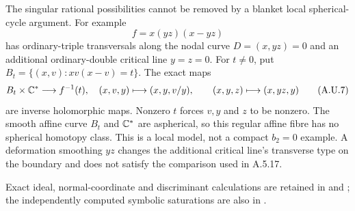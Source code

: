 The singular rational possibilities cannot be
removed by a blanket local spherical-cycle argument.
For example
\[
                     f=x(yz)(x-yz)
                                                        \tag{A.U.6}
\]
has ordinary-triple transversals along the nodal curve
$D=(x,yz)=0$ and an additional ordinary-double
critical line $y=z=0$. For $t\ne0$, put
$B_t=\{(x,v):xv(x-v)=t\}$. The exact maps
\[
 B_t\times\mathbb C^*\longrightarrow f^{-1}(t),
 \quad (x,v,y)\longmapsto(x,y,v/y),\qquad
 (x,y,z)\longmapsto(x,yz,y)
                                                        \tag{A.U.7}
\]
are inverse holomorphic maps. Nonzero $t$ forces
$v,y$ and $z$ to be nonzero. The smooth affine
curve $B_t$ and $\mathbb C^*$ are aspherical, so this
regular affine fibre has no spherical homotopy
class. This is a local model, not a compact
$b_2=0$ example. A deformation smoothing $yz$
changes the additional critical line's transverse
type on the boundary and does not satisfy the
comparison used in A.5.17.

Exact ideal, normal-coordinate and discriminant
calculations are retained in
 and
; the independently
computed symbolic saturations are also in
.




